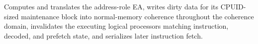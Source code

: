 Computes and translates the address-role EA, writes dirty data for its CPUID-sized maintenance block into normal-memory coherence throughout the coherence domain, invalidates the executing logical processor\textquotesingle{}s matching instruction, decoded, and prefetch state, and serializes later instruction fetch.

